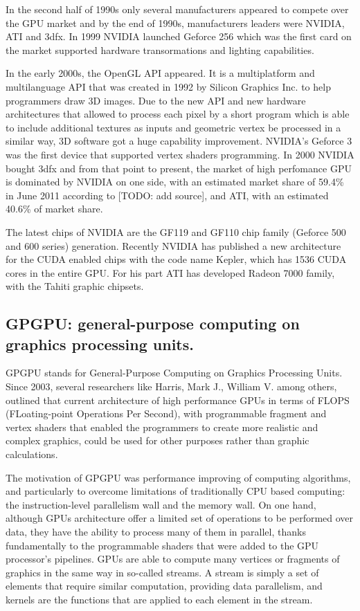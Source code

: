 \documentclass[thesis=M,english]{FITthesis}[2011/07/15]
\begin{document}
In the second half of 1990s only several manufacturers appeared to compete over the GPU market and by the end of 1990s, manufacturers leaders were NVIDIA, ATI and 3dfx. In 1999 NVIDIA launched Geforce 256 which was the first card on the market supported hardware transormations and lighting capabilities. 

In the early 2000s, the OpenGL API appeared. It is a multiplatform and multilanguage API that was created in 1992 by Silicon Graphics Inc. to help programmers draw 3D images. Due to the new API and new hardware architectures that allowed to process each pixel by a short program which is able to include additional textures as inputs and geometric vertex be processed in a similar way, 3D software got a huge capability improvement. NVIDIA's Geforce 3 was the first device that supported vertex shaders programming. In 2000 NVIDIA bought 3dfx and from that point to present, the market of high perfomance GPU is dominated by NVIDIA on one side, with an estimated market share of 59.4\% in June 2011 according to [TODO: add source], and ATI, with an estimated 40.6\% of market share.

The latest chips of NVIDIA are the GF119 and GF110 chip family (Geforce 500 and 600 series) generation. Recently NVIDIA has published a new architecture for the CUDA enabled chips with the code name Kepler, which has 1536 CUDA cores in the entire GPU. For his part ATI has developed Radeon 7000 family, with the Tahiti graphic chipsets.

\subsection{GPGPU: general-purpose computing on graphics processing units.}
GPGPU stands for General-Purpose Computing on Graphics Processing Units. Since 2003, several researchers like Harris, Mark J., William V. among others, outlined that current architecture of high performance GPUs in terms of FLOPS (FLoating-point Operations Per Second), with programmable fragment and vertex shaders that enabled the programmers to create more realistic and complex graphics, could be used for other purposes rather than graphic calculations.

The motivation of GPGPU was performance improving of computing algorithms, and particularly to overcome limitations of traditionally CPU based computing: the instruction-level parallelism wall and the memory wall. On one hand, although GPUs architecture offer a limited set of operations to be performed over data, they have the ability to process many of them in parallel, thanks fundamentally to the programmable shaders that were added to the GPU processor’s pipelines. GPUs are able to compute many vertices or fragments of graphics in the same way in so-called streams. A stream is simply a set of elements that require similar computation, providing data parallelism, and kernels are the functions that are applied to each element in the stream.
\end{document}
